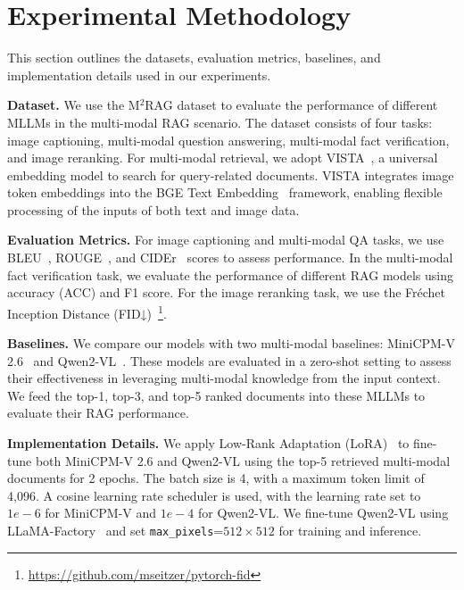 \section{Experimental Methodology} This section outlines the datasets, evaluation metrics, baselines, and implementation details used in our experiments.

\textbf{Dataset.}
We use the M$^2$RAG dataset to evaluate the performance of different MLLMs in the multi-modal RAG scenario. The dataset consists of four tasks: image captioning, multi-modal question answering, multi-modal fact verification, and image reranking. For multi-modal retrieval, we adopt VISTA~\cite{zhou2024vista}, a universal embedding model to search for query-related documents. VISTA integrates image token embeddings into the BGE Text Embedding~\cite{xiao2024c} framework, enabling flexible processing of the inputs of both text and image data.


\textbf{Evaluation Metrics.}
For image captioning and multi-modal QA tasks, we use BLEU~\cite{papineni2002bleu}, ROUGE~\cite{lin2004rouge}, and CIDEr~\cite{vedantam2015cider} scores to assess performance. In the multi-modal fact verification task, we evaluate the performance of different RAG models using accuracy (ACC) and F1 score. For the image reranking task, we use the Fréchet Inception Distance (FID↓)~\cite{heusel2017gans}\footnote{\url{https://github.com/mseitzer/pytorch-fid}}. 

\textbf{Baselines.}
We compare our models with two multi-modal baselines: MiniCPM-V 2.6~\cite{yao2024minicpm} and Qwen2-VL~\cite{Qwen2VL}. These models are evaluated in a zero-shot setting to assess their effectiveness in leveraging multi-modal knowledge from the input context. We feed the top-1, top-3, and top-5 ranked documents into these MLLMs to evaluate their RAG performance.

\textbf{Implementation Details.}
We apply Low-Rank Adaptation (LoRA)~\cite{hu2021lora} to fine-tune both MiniCPM-V 2.6 and Qwen2-VL using the top-5 retrieved multi-modal documents for 2 epochs. The batch size is 4, with a maximum token limit of 4,096. A cosine learning rate scheduler is used, with the learning rate set to $1e-6$ for MiniCPM-V and $1e-4$ for Qwen2-VL. We fine-tune Qwen2-VL using LLaMA-Factory~\cite{zheng2024llamafactory} and set \texttt{max\_pixels}=$512 \times 512$ for training and inference.


